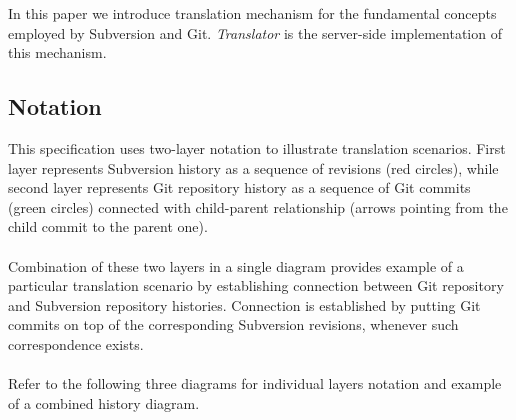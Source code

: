 \renewcommand{\figurename}{Diagram}
In this paper we introduce translation mechanism for the fundamental concepts employed by Subversion and Git.
\emph{Translator} is the server-side implementation of this mechanism.
\subsection{Notation}
This specification uses two-layer notation to illustrate translation scenarios. First layer represents 
Subversion history as a sequence of revisions (red circles), while second layer represents Git repository history %
as a sequence of Git commits (green circles) connected with child-parent relationship (arrows pointing from the child 
commit to the parent one). 
\\\\
Combination of these two layers in a single diagram provides example of a particular translation scenario by
establishing connection between Git repository and Subversion repository histories. Connection is established
by putting Git commits on top of the corresponding Subversion revisions, whenever such correspondence exists. %
\\\\
Refer to the following three diagrams for individual layers notation and example of a combined history diagram.
